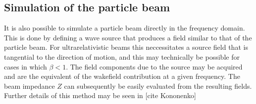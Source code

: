 \subsection{Simulation of the particle beam}

It is also possible to simulate a particle beam directly in the frequency domain. This is done by defining a wave source that produces a field similar to that of the particle beam. For ultrarelativistic beams this neccessitates a source field that is tangential to the direction of motion, and this may technically be possible for cases in which $\beta < 1$. The field components due to the source may be acquired and are the equivalent of the wakefield contribution at a given frequency. The beam impedance $Z$ can subsequently be easily evaluated from the resulting fields. Further details of this method may be seen in [cite Kononenko]

